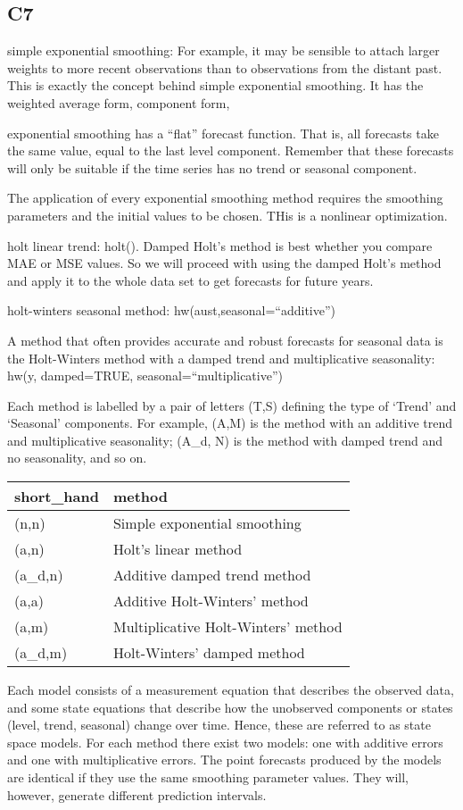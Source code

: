 \documentclass[]{book}
\begin{document}
\subsection{C7}\label{c7}

simple exponential smoothing: For example, it may be sensible to attach
larger weights to more recent observations than to observations from the
distant past. This is exactly the concept behind simple exponential
smoothing. It has the weighted average form, component form,

exponential smoothing has a ``flat'' forecast function. That is, all
forecasts take the same value, equal to the last level component.
Remember that these forecasts will only be suitable if the time series
has no trend or seasonal component.

The application of every exponential smoothing method requires the
smoothing parameters and the initial values to be chosen. THis is a
nonlinear optimization.

holt linear trend: holt(). Damped Holt's method is best whether you
compare MAE or MSE values. So we will proceed with using the damped
Holt's method and apply it to the whole data set to get forecasts for
future years.

holt-winters seasonal method: hw(aust,seasonal=``additive'')

A method that often provides accurate and robust forecasts for seasonal
data is the Holt-Winters method with a damped trend and multiplicative
seasonality: hw(y, damped=TRUE, seasonal=``multiplicative'')

Each method is labelled by a pair of letters (T,S) defining the type of
`Trend' and `Seasonal' components. For example, (A,M) is the method with
an additive trend and multiplicative seasonality; (A\_d, N) is the
method with damped trend and no seasonality, and so on.

\begin{longtable}[]{@{}ll@{}}
\toprule
short\_hand & method\tabularnewline
\midrule
\endhead
(n,n) & Simple exponential smoothing\tabularnewline
(a,n) & Holt's linear method\tabularnewline
(a\_d,n) & Additive damped trend method\tabularnewline
(a,a) & Additive Holt-Winters' method\tabularnewline
(a,m) & Multiplicative Holt-Winters' method\tabularnewline
(a\_d,m) & Holt-Winters' damped method\tabularnewline
\bottomrule
\end{longtable}

Each model consists of a measurement equation that describes the
observed data, and some state equations that describe how the unobserved
components or states (level, trend, seasonal) change over time. Hence,
these are referred to as state space models. For each method there exist
two models: one with additive errors and one with multiplicative errors.
The point forecasts produced by the models are identical if they use the
same smoothing parameter values. They will, however, generate different
prediction intervals.
\end{document}
